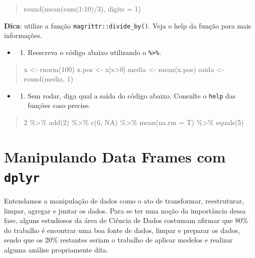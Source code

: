 \documentclass[]{book}
\providecommand{\tightlist}{%
  \setlength{\itemsep}{0pt}\setlength{\parskip}{0pt}}
\begin{document}
\begin{quote}
round(mean(sum(1:10)/3), digits = 1)
\end{quote}

\textbf{Dica}: utilize a função \texttt{magrittr::divide\_by()}. Veja o help da função para mais informações.

\begin{itemize}
\item
  \begin{enumerate}
  \def\labelenumi{\arabic{enumi}.}
  \setcounter{enumi}{1}
  \tightlist
  \item
    Reescreva o código abaixo utilizando o \texttt{\%\textgreater{}\%}.
  \end{enumerate}
\end{itemize}

\begin{quote}
x \textless- rnorm(100)
x.pos \textless- x{[}x\textgreater0{]}
media \textless- mean(x.pos)
saida \textless- round(media, 1)
\end{quote}

\begin{itemize}
\item
  \begin{enumerate}
  \def\labelenumi{\arabic{enumi}.}
  \setcounter{enumi}{2}
  \tightlist
  \item
    Sem rodar, diga qual a saída do código abaixo. Consulte o \texttt{help} das funções caso precise.
  \end{enumerate}
\end{itemize}

\begin{quote}
2 \%\textgreater\%
add(2) \%\textgreater\%
c(6, NA) \%\textgreater\%
mean(na.rm = T) \%\textgreater\%
equals(5)
\end{quote}

\hypertarget{method}{%
\chapter{\texorpdfstring{Manipulando Data Frames com \texttt{dplyr}}{Manipulando Data Frames com dplyr}}\label{method}}

Entendamos a manipulação de dados como o ato de transformar, reestruturar, limpar, agregar e juntar os dados. Para se ter uma noção da importância dessa fase, alguns estudiosos da área de Ciência de Dados costumam afirmar que 80\% do trabalho é encontrar uma boa fonte de dados, limpar e preparar os dados, sendo que os 20\% restantes seriam o trabalho de aplicar modelos e realizar alguma análise propriamente dita.
\end{document}
